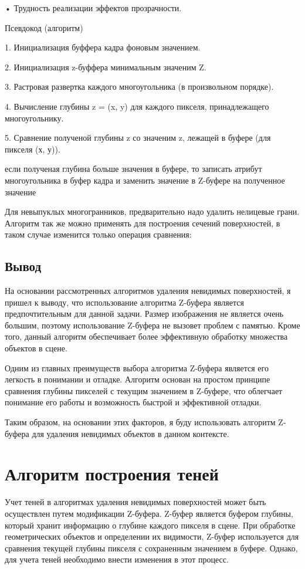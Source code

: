     • Трудность реализации эффектов прозрачности.
    
Псевдокод (алгоритм)

1. Инициализация буффера кадра фоновым значением.

2. Инициализация z-буффера минимальным значеним Z.

3. Растровая развертка каждого многоугольника (в произвольном порядке).

4. Вычисление глубины z = (x, y) для каждого пикселя, принадлежащего многоугольнику.

5. Сравнение полученой глубины z со значеним z, лежащей в буфере (для пикселя (х, у)).

   если полученая глубина больше значения в буфере, то записать атрибут многоугольника
   в буфер кадра и заменить значение в Z-буфере на полученное значение

Для невыпуклых многогранников, предварительно надо удалить нелицевые грани.
Алгоритм так же можно применять для построения сечений поверхностей, в таком случае изменится только операция сравнения:
 
\subsection{Вывод}

 На основании рассмотренных алгоритмов удаления невидимых поверхностей, я пришел к выводу, что использование алгоритма Z-буфера является предпочтительным для данной задачи. Размер изображения не является очень большим, поэтому использование Z-буфера не вызовет проблем с памятью. Кроме того, данный алгоритм обеспечивает более эффективную обработку множества объектов в сцене.

Одним из главных преимуществ выбора алгоритма Z-буфера является его легкость в понимании и отладке. Алгоритм основан на простом принципе сравнения глубины пикселей с текущим значением в Z-буфере, что облегчает понимание его работы и возможность быстрой и эффективной отладки.

Таким образом, на основании этих факторов, я буду использовать алгоритм Z-буфера для удаления невидимых объектов в данном контексте.


\section{Алгоритм построения теней}

Учет теней в алгоритмах удаления невидимых поверхностей может быть осуществлен путем модификации Z-буфера. Z-буфер является буфером глубины, который хранит информацию о глубине каждого пикселя в сцене. При обработке геометрических объектов и определении их видимости, Z-буфер используется для сравнения текущей глубины пикселя с сохраненным значением в буфере. Однако, для учета теней необходимо внести изменения в этот процесс.

